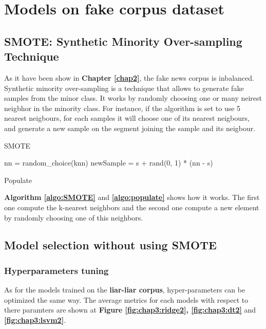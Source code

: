 \section{Models on fake corpus dataset}
\subsection{SMOTE: Synthetic Minority Over-sampling Technique\cite{Chawla2011}}
As it have been show in \textbf{Chapter \ref{chap2}}, the fake news corpus is inbalanced. Synthetic minority over-sampling is a technique that allows to generate fake samples from the minor class. It works by randomly choosing one or many neirest neigbhor in the minority class. For instance, if the algorithm is set to use 5 nearest neigbours, for each samples it will choose one of its nearest neigbours, and generate a new sample on the segment joining the sample and its neigbour. 

\begin{algorithm}
	 \caption{SMOTE}
	 \label{algo:SMOTE}
\end{algorithm}

\begin{algorithm}
	nn = random\_choice(knn)\;
	newSample = s + rand(0, 1) * (nn - s)\;
	\caption{Populate}
	\label{algo:populate}
\end{algorithm}

\textbf{Algorithm \ref{algo:SMOTE}} and \textbf{\ref{algo:populate}} shows how it works. The first one compute the k-nearest neighbors and the second one compute a new element by randomly choosing one of this neighbors. 

\subsection{Model selection without using SMOTE}
\subsubsection{Hyperparameters tuning}
As for the models trained on the \textbf{liar-liar corpus}, hyper-parameters can be optimized the same way. The average metrics for each models with respect to there paramters are shown at \textbf{Figure \ref{fig:chap3:ridge2}, \ref{fig:chap3:dt2}} and \textbf{\ref{fig:chap3:lsvm2}}. \\

